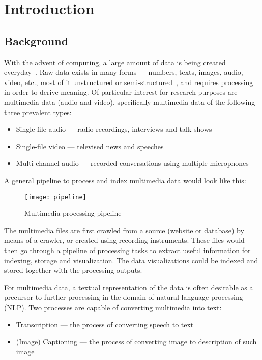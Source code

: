 \chapter{Introduction}

\section{Background}\label{sec:in:back}

With the advent of computing, a large amount of data is being created
everyday~\cite{emc}.
Raw data exists in many forms --- numbers, texts, images, audio, video, etc.,
most of it unstructured or semi-structured~\cite{emc},
and requires processing in order to derive meaning. Of particular interest for
research purposes are multimedia data (audio and video), specifically
multimedia data of the following three prevalent types:

\begin{itemize}
    \item Single-file audio --- radio recordings, interviews and talk shows
    \item Single-file video --- televised news and speeches
    \item Multi-channel audio --- recorded conversations using multiple
    microphones
\end{itemize}

A general pipeline to process and index multimedia data would look like this:

\begin{figure}[h]
\begin{center}
    \texttt{[image: pipeline]}
    \caption{Multimedia processing pipeline}
\end{center}
\end{figure}

The multimedia files are first crawled from a source (website or database) by
means of a crawler, or created using recording instruments. These files would
then go through a pipeline of processing tasks to extract useful information
for indexing, storage and visualization. The data visualizations could be
indexed and stored together with the processing outputs. 

For multimedia data, a textual representation of the data is often desirable
as a precursor to further processing in the domain of natural language
processing (NLP). Two processes are capable of converting
multimedia into text:

\begin{itemize}
    \item Transcription --- the process of converting speech to
    text~\cite{transcribe-mw}
    \item (Image) Captioning --- the process of converting image to
    description of such image~\cite{caption}
\end{itemize}

